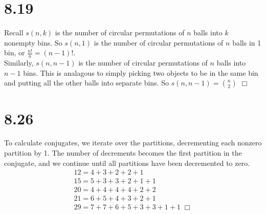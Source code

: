 \documentclass{article}
\begin{document}
\section*{8.19}
Recall $s(n,k)$ is the number of circular permutations of $n$ balls into $k$ nonempty bins. So $s(n,1)$ is the number of circular permutations of $n$ balls in 1 bin, or $\tfrac{n!}{n} = (n-1)!$.\\
Similarly, $s(n,n-1)$ is the number of circular permutations of $n$ balls into $n-1$ bins. This is analagous to simply picking two objects to be in the same bin and putting all the other balls into separate bins. So $s(n,n-1) = \binom{n}{2}$ $\Box$

\section*{8.26}
To calculate conjugates, we iterate over the partitions, decrementing each nonzero partition by 1. The number of decrements becomes the first partition in the conjugate, and we continue until all partitions have been decremented to zero.
\begin{gather*}
12 = 4 + 3 + 2 + 2 + 1\\
15 = 5 + 3 + 3 + 2 + 1 + 1\\
20 = 4 + 4 + 4 + 4 + 2 + 2\\
21 = 6 + 5 + 4 + 3 + 2 + 1\\
29 = 7 + 7 + 6 + 5 + 3 + 3 + 1 + 1 \; \Box
\end{gather*}
\end{document}
